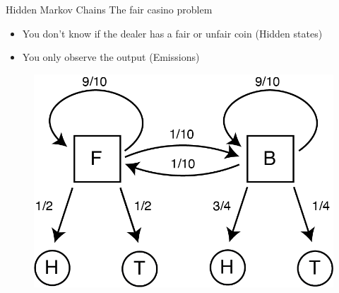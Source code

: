 \documentclass{beamer}
\begin{document}
\begin{frame}{Hidden Markov Chains}
	The fair casino problem 
	\begin{itemize}
		\item You don't know if the dealer has a fair or unfair coin (Hidden states)
		\item You only observe the output (Emissions)
	\end{itemize}
		\begin{figure}[h]
		\centering
			\includegraphics[scale=0.6]{../Figures/hmm_fair_casino.png}
	\end{figure}
\end{frame}
\end{document}
